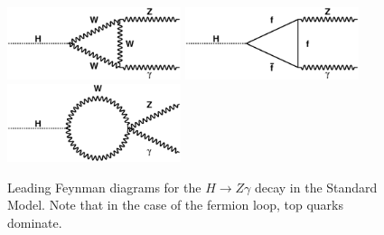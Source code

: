 \begin{figure}[!htbp]
  \begin{center}
  {\includegraphics[width=2in]{figures/loop1}}
  {\includegraphics[width=2in]{figures/loop2}}
  {\includegraphics[width=2in]{figures/loop3}}
  \caption{Leading Feynman diagrams for the $H\rightarrow Z\gamma$
    decay in the Standard Model. Note that in the case of the fermion
    loop, top quarks dominate.} 
  \label{fig:feynman}
  \end{center}
\end{figure}

% 
% 
